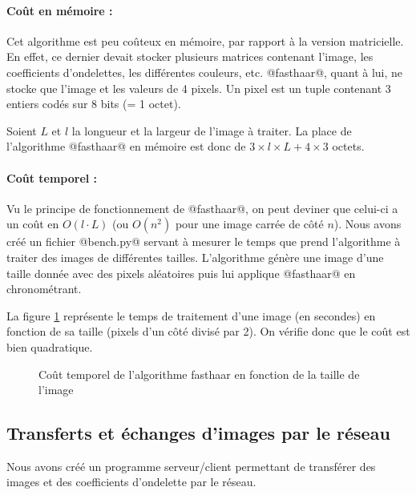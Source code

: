 \documentclass{article}
\begin{document}
\paragraph{Coût en mémoire :}

Cet algorithme est peu coûteux en mémoire, par rapport à la version matricielle. En effet, ce dernier devait stocker plusieurs matrices contenant l'image, les coefficients d'ondelettes, les différentes couleurs, etc. @fasthaar@, quant à lui, ne stocke que l'image et les valeurs de 4 pixels. Un pixel est un tuple contenant 3 entiers codés sur 8 bits (= 1 octet). 

Soient $L$ et $l$ la longueur et la largeur de l'image à traiter. 
La place de l'algorithme @fasthaar@ en mémoire est donc de $3\times{}l\times{}L + 4 \times{} 3$ octets.

\paragraph{Coût temporel :}

Vu le principe de fonctionnement de @fasthaar@, on peut deviner que celui-ci a un coût en $O(l\cdot L)$ (ou $O(n^2)$ pour une image carrée de côté $n$). Nous avons créé un fichier @bench.py@ servant à mesurer le temps que prend l'algorithme à traiter des images de différentes tailles. L'algorithme génère une image d'une taille donnée avec des pixels aléatoires puis lui applique @fasthaar@ en chronométrant. 

La figure \ref{bench1} représente le temps de traitement d'une image (en secondes) en fonction de sa taille (pixels d'un côté divisé par 2). On vérifie donc que le coût est bien quadratique. 

\begin{figure}[!h]
\begin{center}


\caption{Coût temporel de l'algorithme fasthaar en fonction de la taille de l'image}
\label{bench1}
\end{center}
\end{figure}

\clearpage


\subsection{Transferts et échanges d'images par le réseau}
\label{net}
Nous avons créé un programme serveur/client permettant de transférer des images et des coefficients d'ondelette par le réseau.
\end{document}
